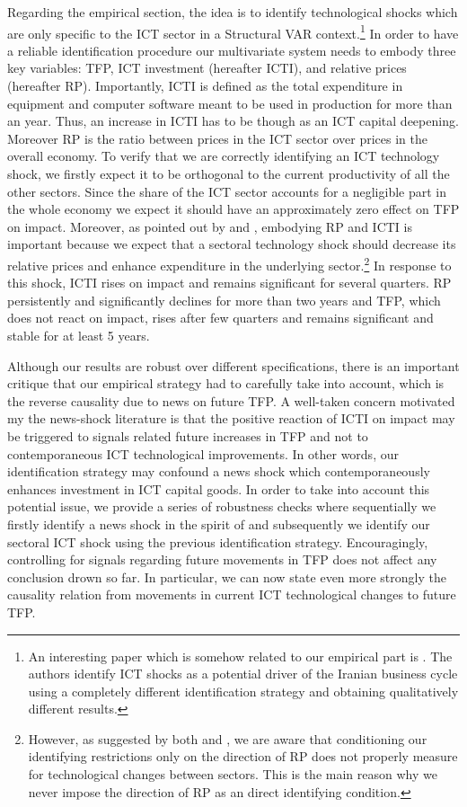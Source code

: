 \documentclass[12pt]{article}
\begin{document}
Regarding the empirical section, the idea is to identify technological shocks which are only specific to the ICT sector in a Structural VAR context.\footnote{An interesting paper which is somehow related to our empirical part is \cite{jafari2012impact}. The authors identify ICT shocks as a potential driver of the Iranian business cycle using a completely different identification strategy and obtaining qualitatively different results.} In order to have a reliable identification procedure our multivariate system needs to embody three key variables: TFP, ICT investment (hereafter ICTI), and relative prices (hereafter RP). Importantly, ICTI is defined as the total expenditure in equipment and computer software meant to be used in production for more than an year. Thus, an increase in ICTI has to be though as an ICT capital deepening. Moreover RP is the ratio between prices in the ICT sector over prices in the overall economy. To verify that we are correctly identifying an ICT technology shock, we firstly expect it to be orthogonal to the current productivity of all the other sectors. Since the share of the ICT sector accounts for a negligible part in the whole economy we expect it should have an approximately zero effect on TFP on impact. Moreover, as pointed out by \cite{greenwood1997long} and \cite{fisher2006dynamic}, embodying RP and ICTI is important because we expect that a sectoral technology shock should decrease its relative prices and enhance expenditure in the underlying sector.\footnote{However, as suggested by both \cite{greenwood2000role} and \cite{basu2010sector}, we are aware that conditioning our identifying restrictions only on the direction of RP does not properly measure for technological changes between sectors. This is the main reason why we never impose the direction of RP as an direct identifying condition.} In response to this shock, ICTI rises on impact and remains significant for several quarters. RP persistently and significantly declines for more than two years and TFP, which does not react on impact, rises after few quarters and remains significant and stable for at least 5 years. 

Although our results are robust over different specifications, there is an important critique that our empirical strategy had to carefully take into account, which is the reverse causality due to news on future TFP. A well-taken concern motivated my the news-shock literature is that the positive reaction of ICTI on impact may be triggered to signals related future increases in TFP and not to contemporaneous ICT technological improvements. In other words, our identification strategy may confound a news shock which contemporaneously enhances investment in ICT capital goods. In order to take into account this potential issue, we provide a series of robustness checks where sequentially we firstly identify a news shock in the spirit of \cite{barsky2011news} and subsequently we identify our sectoral ICT shock using the previous identification strategy. Encouragingly, controlling for signals regarding future movements in TFP does not affect any conclusion drown so far. In particular, we can now state even more strongly the causality relation from movements in current ICT technological changes to future TFP. 
\end{document}
